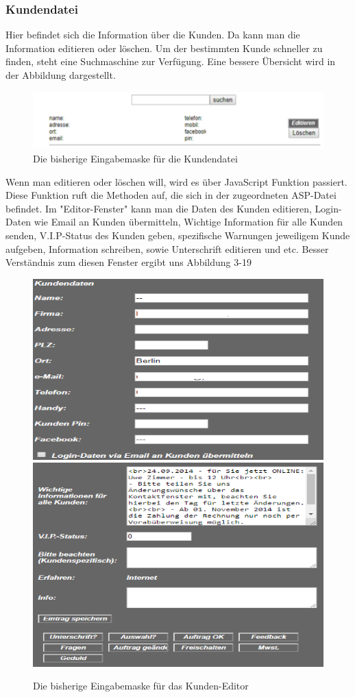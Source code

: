 \pagebreak
\subsubsection{Kundendatei}

Hier befindet sich die Information über die Kunden. Da kann man die Information editieren oder löschen. Um der bestimmten Kunde schneller zu finden, steht eine Suchmaschine zur Verfügung. Eine bessere Übersicht wird in der Abbildung dargestellt. 

\begin{figure}[h]
	\centering
	\includegraphics[width=0.7\linewidth]{Graphics/kundenDatei.png}
	\caption[Kundeansicht]{Die bisherige Eingabemaske für die Kundendatei}
	\label{fig:KundenDatei}
\end{figure}

Wenn man editieren oder löschen will, wird es über JavaScript Funktion passiert. Diese Funktion ruft die Methoden auf, die sich in der zugeordneten ASP-Datei befindet. Im "Editor-Fenster" kann man die Daten des Kunden editieren, Login-Daten wie Email an Kunden übermitteln, Wichtige Information für alle Kunden senden, V.I.P-Status des Kunden geben, spezifische Warnungen jeweiligem Kunde aufgeben, Information schreiben, sowie Unterschrift editieren und etc. Besser Verständnis zum diesen Fenster ergibt uns Abbildung 3-19

\pagebreak

\begin{figure}[h]
	\centering
	\includegraphics[width=0.7\linewidth]{Graphics/kundeEditieren.png}
	\includegraphics[width=0.7\linewidth]{Graphics/kundeEditieren1.png}
	\caption[Kundeansicht]{Die bisherige Eingabemaske für das Kunden-Editor}
	\label{fig:Kunden Editor}
\end{figure}


